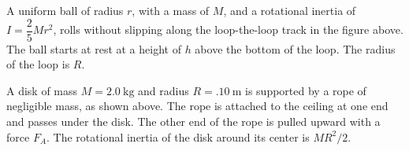 \documentclass{../../oss-apphys-exam}
\newcounter{lastmc}
\begin{document}
\begin{questions}
  \setcounter{question}{\value{lastmc}}

  \question A uniform ball of radius $r$, with a mass of $M$, and a rotational
  inertia of $I=\dfrac25Mr^2$, rolls without slipping along the loop-the-loop
  track in the figure above. The ball starts at rest at a height of $h$ above
  the bottom of the loop. The radius of the loop is $R$.
  \newpage
  
  \question A disk of mass $M =\SI{2.0}{\kilo\gram}$ and radius
  $R=\SI{.10}\metre$ is supported by a rope of negligible mass, as shown
  above. The rope is attached to the ceiling at one end and passes under the
  disk. The other end of the rope is pulled upward with a force $F_A$. The
  rotational inertia of the disk around its center is $MR^2/2$.
\end{questions}
\end{document}
